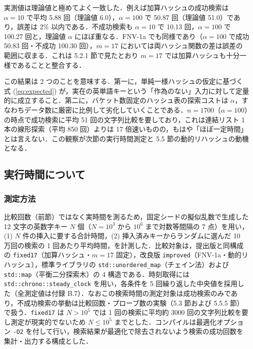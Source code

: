 実測値は理論値と極めてよく一致した．例えば加算ハッシュの成功検索は $\alpha=10$ で平均 5.88 回（理論値 6.0），$\alpha=100$ で 50.87 回（理論値 51.0）であり，誤差は 2\% 以内である．不成功検索も $\alpha=10$ で 10.13 回，$\alpha=100$ で 100.27 回と，理論値 $\alpha$ にほぼ重なる．FNV-1a でも同様であり（$\alpha=100$ で成功 50.83 回・不成功 100.30 回），$m=17$ においては両ハッシュ関数の差は誤差の範囲に収まる．これは 5.2.1 節で見たとおり $m=17$ では加算ハッシュも十分一様であることと整合する．

この結果は 2 つのことを意味する．第一に，単純一様ハッシュの仮定に基づく式 (\ref{eq:expected}) が，実在の英単語キーという「作為のない」入力に対して定量的に成立すること．第二に，バケット数固定のハッシュ表の探索コストは $\alpha$，すなわちデータ数に厳密に比例して劣化していくことである．$n=1700$（$\alpha=100$）の時点で成功検索に平均 51 回の文字列比較を要しており，これは連結リスト 1 本の線形探索（平均 850 回）よりは 17 倍速いものの，もはや「ほぼ一定時間」とは言えない．この観察が次節の実行時間測定と 5.5 節の動的リハッシュの動機となる．

\subsection{実行時間について}

\subsubsection{測定方法}

比較回数（前節）ではなく実時間を測るため，固定シードの擬似乱数で生成した 12 文字の英数字キー $N$ 個（$N = 10^3$ から $10^6$ まで対数等間隔の 7 点）を用い，(1) $N$ 件の挿入に要する合計時間，(2) 挿入済みキーからランダムに選んだ 10 万回の検索の 1 回あたり平均時間，を計測した．比較対象は，提出版と同構成の {\tt fixed17}（加算ハッシュ・$m=17$ 固定），改良版 {\tt improved}（FNV-1a・動的リハッシュ），標準ライブラリの {\tt std::unordered\_map}（チェイン法）および {\tt std::map}（平衡二分探索木）の 4 構造である．時刻取得には {\tt std::chrono::steady\_clock} を用い，各条件を 5 回繰り返した中央値を採用した（全測定値は付録 B.7）．なおこの検索時間の測定対象は成功検索のみであり，不成功検索の挙動は比較回数・プローブ数の実験（5.3 節および 5.5.5 節）で扱う．{\tt fixed17} は $N > 10^5$ では 1 回の検索に平均約 3000 回の文字列比較を要し測定が現実的でないため $N \le 10^5$ までとした．コンパイルは最適化オプション {\tt -O2} を付して行い，検索結果が最適化で除去されないよう検索の成功回数を集計・出力する構成とした．

